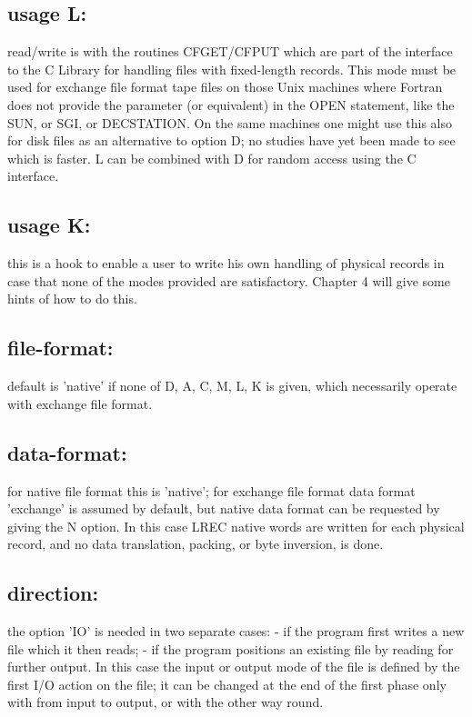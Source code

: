\subsection*{usage L:}

read/write is with the routines CFGET/CFPUT which are part of the
interface to the C Library for handling files with fixed-length records.
This mode must be used for exchange file format tape files on those
Unix machines where Fortran does not provide the parameter
 (or equivalent) in the OPEN statement,
like the SUN, or SGI, or DECSTATION.
On the same machines one might use this also for disk files as
an alternative to option D; no studies have yet been made to
see which is faster.
L can be combined with D for random access using the C interface.

\subsection*{usage K:}

this is a hook to enable a user to write his own handling of physical
records in case that none of the modes provided are satisfactory.
Chapter 4 will give some hints of how to do this.

\subsection*{file-format:}

default is 'native' if none of D, A, C, M, L, K is given,
which necessarily operate with exchange file format.

\subsection*{data-format:}

for native file format this is 'native';
for exchange file format data format 'exchange' is assumed by default,
but native data format can be requested by giving the N option.
In this case LREC native words are written for each physical record,
and no data translation, packing, or byte inversion, is done.

\subsection*{direction:}

the option 'IO' is needed in two separate cases:
   - if the program first writes a new file which it then reads;
   - if the program positions an existing file by reading
     for further output.
In this case the input or output mode of the file is defined
by the first I/O action on the file;
it can be changed at the end of the first phase only with 
from input to output, or with  the other way round.

